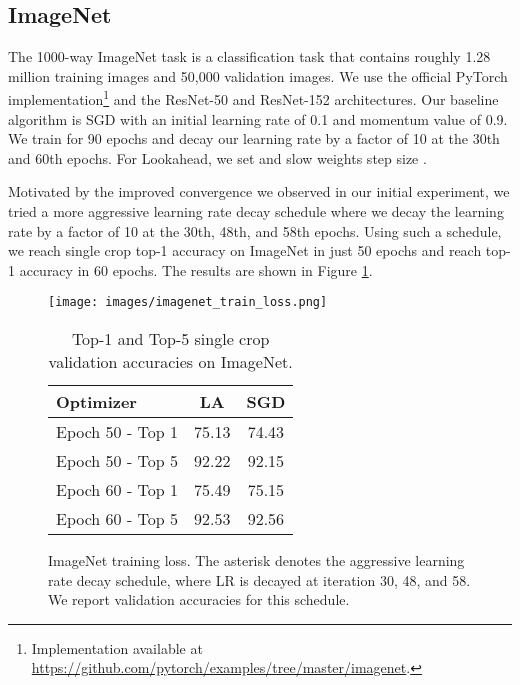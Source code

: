 \documentclass{article}
\begin{document}
 \subsection{ImageNet} 

The 1000-way ImageNet task \citep{deng2009imagenet} is a classification task that contains roughly 1.28 million training images and 50,000 validation images. We use the official PyTorch implementation\footnote{Implementation available at \url{https://github.com/pytorch/examples/tree/master/imagenet}.} and the ResNet-50 and ResNet-152  \citep{he2016deep} architectures. Our baseline algorithm is SGD with an initial learning rate of 0.1 and momentum value of 0.9. We train for 90 epochs and decay our learning rate by a factor of 10 at the 30th and 60th epochs. For Lookahead, we set  and slow weights step size .

Motivated by the improved convergence we observed in our initial experiment, we tried a more aggressive learning rate decay schedule where we decay the learning rate by a factor of 10 at the 30th, 48th, and 58th epochs. Using such a schedule, we reach  single crop top-1 accuracy on ImageNet in just 50 epochs and reach  top-1 accuracy in 60 epochs. The results are shown in Figure \ref{fig:imagenet-visual}.


\begin{figure}[t]
    \centering
    \begin{minipage}{0.48 \linewidth}
    \texttt{[image: images/imagenet\_train\_loss.png]}
    \end{minipage} \hfill
    \begin{minipage}{0.48 \linewidth}
\begin{table}[H]
\label{tabel:imagenet-compare}
\begin{center}
\begin{small}
\begin{sc}
\begin{tabular}{l c c }
\toprule
Optimizer & LA & SGD   \\
\midrule
Epoch 50 - Top 1 & 75.13 & 74.43  \\
Epoch 50 - Top 5 & 92.22 & 92.15  \\ 
Epoch 60 - Top 1 & 75.49 & 75.15  \\
Epoch 60 - Top 5 & 92.53 & 92.56  \\ 
\bottomrule
\end{tabular}
\end{sc}
\end{small}
\end{center}
\caption{Top-1 and Top-5 single crop validation accuracies on ImageNet.}
\vskip -0.1in
\end{table}
\end{minipage}
\caption{ImageNet training loss. The asterisk denotes the aggressive learning rate decay schedule, where LR is decayed at iteration 30, 48, and 58. We report validation accuracies for this schedule.}
\vskip -0.1in
\label{fig:imagenet-visual}
    \end{figure}
\end{document}
